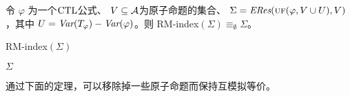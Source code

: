 \begin{corollary}
	令 $\varphi$ 为一个$\textrm{CTL}$公式、 $V\subseteq\cal A$为原子命题的集合、
	$\Sigma=\emph{ERes}(\textsc{uf}(\varphi,V\cup U),V)$，其中 $U=\textit{Var}(T_\varphi)-\textit{Var}(\varphi)$。则
	RM-index$(\Sigma)\equiv_\emptyset \Sigma$。
\end{corollary}



\begin{algorithm}[tb]
	\caption{{RM-index}$(\Sigma)$}
	\label{alg:remove:index}
	\LinesNumbered
	\Return $\Sigma$
\end{algorithm}


通过下面的定理，可以移除掉一些原子命题而保持互模拟等价。

